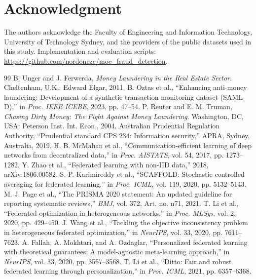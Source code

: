 \documentclass[a4paper, 10pt, conference]{ieeeconf}
\begin{document}
\section*{Acknowledgment}
The authors acknowledge the Faculty of Engineering and Information Technology,
University of Technology Sydney, and the providers of the public datasets used
in this study. Implementation and evaluation scripts:
\url{https://github.com/nordonezc/moe_fraud_detection}.

\begin{thebibliography}{99}
 B. Unger and J. Ferwerda, \emph{Money Laundering in the Real Estate Sector}. Cheltenham, U.K.: Edward Elgar, 2011.
 B. Oztas et al., ``Enhancing anti-money laundering: Development of a synthetic transaction monitoring dataset (SAML-D),'' in \emph{Proc. IEEE ICEBE}, 2023, pp. 47--54.
 P. Reuter and E. M. Truman, \emph{Chasing Dirty Money: The Fight Against Money Laundering}. Washington, DC, USA: Peterson Inst. Int. Econ., 2004.
 Australian Prudential Regulation Authority, ``Prudential standard CPS 234: Information security,'' APRA, Sydney, Australia, 2019.
 H. B. McMahan et al., ``Communication-efficient learning of deep networks from decentralized data,'' in \emph{Proc. AISTATS}, vol. 54, 2017, pp. 1273--1282.
 Y. Zhao et al., ``Federated learning with non-IID data,'' 2018, arXiv:1806.00582.
 S. P. Karimireddy et al., ``SCAFFOLD: Stochastic controlled averaging for federated learning,'' in \emph{Proc. ICML}, vol. 119, 2020, pp. 5132--5143.
 M. J. Page et al., ``The PRISMA 2020 statement: An updated guideline for reporting systematic reviews,'' \emph{BMJ}, vol. 372, Art. no. n71, 2021.
 T. Li et al., ``Federated optimization in heterogeneous networks,'' in \emph{Proc. MLSys}, vol. 2, 2020, pp. 429--450.
 J. Wang et al., ``Tackling the objective inconsistency problem in heterogeneous federated optimization,'' in \emph{NeurIPS}, vol. 33, 2020, pp. 7611--7623.
 A. Fallah, A. Mokhtari, and A. Ozdaglar, ``Personalized federated learning with theoretical guarantees: A model-agnostic meta-learning approach,'' in \emph{NeurIPS}, vol. 33, 2020, pp. 3557--3568.
 T. Li et al., ``Ditto: Fair and robust federated learning through personalization,'' in \emph{Proc. ICML}, 2021, pp. 6357--6368.


\end{thebibliography}
\end{document}
